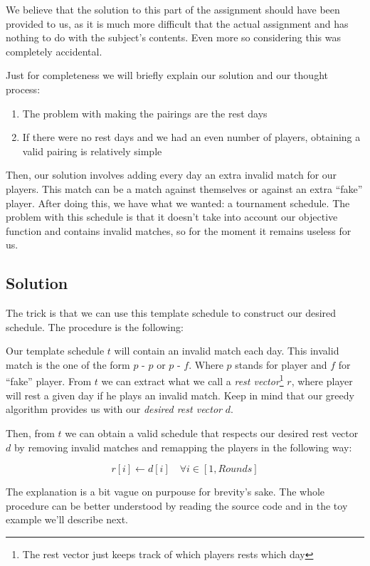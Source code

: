 \documentclass[a4paper, 10pt]{article}
\begin{document}
We believe that the solution to this part of the assignment should have been provided to us, as it is much more difficult that the actual assignment and has nothing to do with the subject's contents. Even more so considering this was completely accidental.


Just for completeness we will briefly explain our solution and our thought process:

\begin{enumerate}
    \item The problem with making the pairings are the rest days
    \item If there were no rest days and we had an even number of players, obtaining a valid pairing is relatively simple
\end{enumerate}

Then, our solution involves adding every day an extra invalid match for our players. This match can be a match against themselves or against an extra ``fake'' player. After doing this, we have what we wanted: a tournament schedule. The problem with this schedule is that it doesn't take into account our objective function and contains invalid matches, so for the moment it remains useless for us.


\subsection{Solution}
The trick is that we can use this template schedule to construct our desired schedule. The procedure is the following:

Our template schedule $t$ will contain an invalid match each day. This invalid match is the one of the form $p$ - $p$ or $p$ - $f$. Where $p$ stands for player and $f$ for ``fake'' player. From $t$ we can extract what we call a \textit{rest vector}\footnote{The rest vector just keeps track of which players rests which day} $r$, where player will rest a given day if he plays an invalid match. Keep in mind that our greedy algorithm provides us with our \textit{desired rest vector} $d$.

Then, from $t$ we can obtain a valid schedule that respects our desired rest vector $d$ by removing invalid matches and remapping the players in the following way:


\begin{equation}
    \label{eq:remap}
    r[i] \leftarrow d[i] \quad \forall i \in [1, Rounds]
\end{equation}

The explanation is a bit vague on purpouse for brevity's sake. The whole procedure can be better understood by reading the source code and in the toy example we'll describe next.
\end{document}

